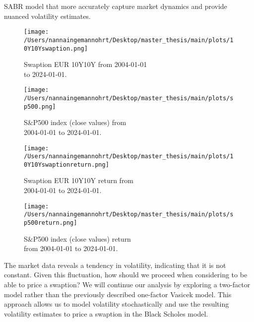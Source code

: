 SABR model that more accurately capture market dynamics and provide nuanced volatility estimates.
\begin{figure}[H]
    \centering
    \begin{minipage}{0.5\textwidth}
        \texttt{[image: /Users/nannaingemannohrt/Desktop/master\_thesis/main/plots/10Y10Yswaption.png]}
        \caption{Swaption EUR 10Y10Y from  2004-01-01 \\ to 2024-01-01.}
        \label{10Y10Y dev}
    \end{minipage}\hfill 
    \begin{minipage}{0.5\textwidth}
        \texttt{[image: /Users/nannaingemannohrt/Desktop/master\_thesis/main/plots/sp500.png]}
        \caption{S$\&$P500 index (close values) from \\ 2004-01-01 to 2024-01-01.}
        \label{sp500 dev}
    \end{minipage}
\end{figure}

\begin{figure}[H]
    \centering
    \begin{minipage}{0.5\textwidth}
        \texttt{[image: /Users/nannaingemannohrt/Desktop/master\_thesis/main/plots/10Y10Yswaptionreturn.png]}
        \caption{Swaption EUR 10Y10Y return from  \\ 2004-01-01 to 2024-01-01.}
        \label{10Y10Y return}
    \end{minipage}\hfill 
    \begin{minipage}{0.5\textwidth}
        \texttt{[image: /Users/nannaingemannohrt/Desktop/master\_thesis/main/plots/sp500return.png]}
        \caption{S$\&$P500 index (close values) return  \\ from 2004-01-01 to 2024-01-01.}
        \label{sp500 return}
    \end{minipage}
\end{figure}
The market data reveals a tendency in 
volatility, indicating that it is not constant. 
Given this fluctuation, how should we proceed when 
considering to be able to price a swaption? We will continue our 
analysis by exploring a two-factor model rather 
than the previously described one-factor Vasicek model. 
This approach allows us to model volatility 
stochastically and use the resulting volatility 
estimates to price a swaption in the Black Scholes model. 
